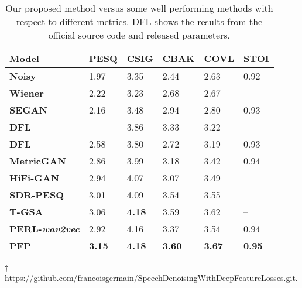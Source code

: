 \documentclass[a4paper]{article}
\begin{document}
\begin{table}[t]
\begin{threeparttable}
\caption{Our proposed method versus some well performing methods with respect to different metrics. DFL\tnote{$\dag$} shows the results from the official source code and released parameters.}
\centering
\small
\begin{tabular*}{\linewidth}{l|P{5.8mm} P{5.8mm} P{5.8mm} P{5.8mm} P{5.8mm}}
\hline
Model  & PESQ & CSIG & CBAK & COVL & STOI\\
\hline
\hline
\textbf{Noisy} & 1.97 & 3.35 & 2.44 & 2.63 & 0.92\\
\textbf{Wiener \cite{paliwal1987speech}} & 2.22 & 3.23 & 2.68 & 2.67 & --\\
\textbf{SEGAN \cite{pascual2017segan}} & 2.16 & 3.48 & 2.94 & 2.80 & 0.93\\
\textbf{DFL \cite{germain2019speech}} & -- & 3.86 & 3.33 & 3.22 & --\\
\textbf{DFL}\tnote{$\dag$} & 2.58 & 3.80 & 2.72 & 3.19 & 0.93\\
\textbf{MetricGAN \cite{fu2019metricgan}} & 2.86 & 3.99 & 3.18 & 3.42 & 0.94\\
\textbf{HiFi-GAN \cite{su2020hifi}} & 2.94 & 4.07 & 3.07 & 3.49 & --\\
\textbf{SDR-PESQ \cite{kim2019end}} & 3.01 & 4.09 & 3.54 & 3.55 & --\\
\textbf{T-GSA \cite{kim2020t}} & 3.06 & {\bf 4.18} & 3.59 & 3.62 & --\\
\textbf{PERL-{\it wav2vec} \cite{kataria2020perceptual}} & 2.92 & 4.16 & 3.37 & 3.54 & 0.94\\
\hline
\hline
\textbf{PFP} & \textbf{3.15} & \textbf{4.18} & \textbf{3.60} & \textbf{3.67} & \textbf{0.95}\\
\hline
\end{tabular*}
\begin{tablenotes}
\scriptsize
\item[$\dag$] \href{https://github.com/francoisgermain/SpeechDenoisingWithDeepFeatureLosses.git}{https://github.com/francoisgermain/SpeechDenoisingWithDeepFeatureLosses.git}.
\end{tablenotes}
\label{tab:denoise}
\end{threeparttable}
\end{table}
\end{document}
